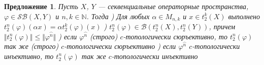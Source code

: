 \documentclass[12pt]{article}
\newtheorem{proposition}[theorem]{Предложение}
\begin{document}
\begin{proposition}\label{PrT2nOfOpIsWellDef}
Пусть $X$, $Y$ --- секвенциальные операторные пространства, $\varphi\in\mathcal{SB}(X,Y)$ и $n,k\in\mathbb{N}$. Тогда 
) Для любых $\alpha\in M_{n,k}$ и $x\in t_2^k(X)$ выполнено $t_2^n(\varphi)(\alpha x)=\alpha t_2^k(\varphi)(x)$
) $t_2^n(\varphi)\in\mathcal{B}(t_2^n(X),t_2^n(Y))$, причем $\Vert t_2^n(\varphi)\Vert\leq\Vert\varphi^{\wideparen{n}}\Vert$
) если $\varphi^{\wideparen{n}}$ (строго) $c$-топологически сюръективно, то $t_2^n(\varphi)$ так же (строго) $c$-топологически сюръективно
)  если $\varphi^{\wideparen{n}}$ $c$-топологически инъективно, то $t_2^n(\varphi)$ так же $c$-топологически инъективно
\end{proposition}
\end{document}
